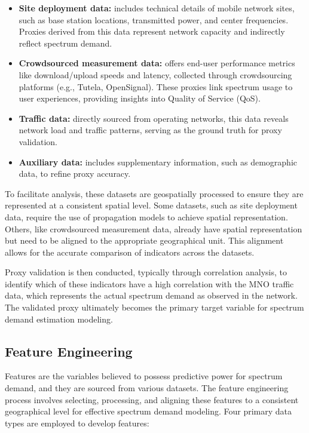 \documentclass[conference]{IEEEtran}
\begin{document}
\begin{itemize}
\item \textbf{Site deployment data:} includes technical details of mobile network sites, such as base station locations, transmitted power, and center frequencies. Proxies derived from this data represent network capacity and indirectly reflect spectrum demand.
\item \textbf{Crowdsourced measurement data:} offers end-user performance metrics like download/upload speeds and latency, collected through crowdsourcing platforms (e.g., Tutela, OpenSignal). These proxies link spectrum usage to user experiences, providing insights into Quality of Service (QoS).
\item \textbf{Traffic data:} directly sourced from operating networks, this data reveals network load and traffic patterns, serving as the ground truth for proxy validation.
\item \textbf{Auxiliary data:} includes supplementary information, such as demographic data, to refine proxy accuracy.
\end{itemize}

To facilitate analysis, these datasets are geospatially processed to ensure they are represented at a consistent spatial level. Some datasets, such as site deployment data, require the use of propagation models to achieve spatial representation. Others, like crowdsourced measurement data, already have spatial representation but need to be aligned to the appropriate geographical unit. This alignment allows for the accurate comparison of indicators across the datasets.

Proxy validation is then conducted, typically through correlation analysis, to identify which of these indicators have a high correlation with the MNO traffic data, which represents the actual spectrum demand as observed in the network. The validated proxy ultimately becomes the primary target variable for spectrum demand estimation modeling.

\subsection{Feature Engineering}
Features are the variables believed to possess predictive power for spectrum demand, and they are sourced from various datasets. The feature engineering process involves selecting, processing, and aligning these features to a consistent geographical level for effective spectrum demand modeling. Four primary data types are employed to develop features:
\end{document}
